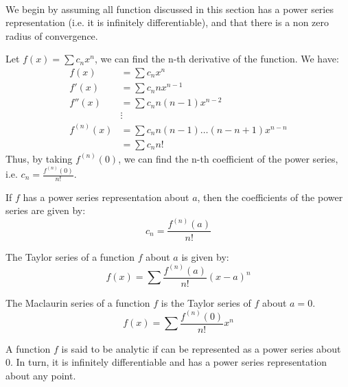 \documentclass[11pt]{article}
\begin{document}
\paragraph{} We begin by assuming all function discussed in this section has a power series representation (i.e. it is infinitely differentiable), and that there is a non zero radius of convergence.
\begin{example}
    Let $f(x) = \sum c_n x^n$, we can find the n-th derivative of the function. We have:
    \begin{align*}
        f(x) &= \sum c_n x^n \\
        f'(x) &= \sum c_n n x^{n-1} \\
        f''(x) &= \sum c_n n(n-1) x^{n-2} \\
        &\vdots \\
        f^{(n)}(x) &= \sum c_n n(n-1) \ldots (n-n+1) x^{n-n} \\
        &= \sum c_n n!
    \end{align*}
    Thus, by taking $f^{(n)}(0)$, we can find the n-th coefficient of the power series, i.e. $c_n = \frac{f^{(n)}(0)}{n!}$.
\end{example}
\begin{theorem}
    If $f$ has a power series representation about $a$, then the coefficients of the power series are given by:
    \begin{equation}
        c_n = \frac{f^{(n)}(a)}{n!}
    \end{equation}
\end{theorem}
\begin{definition}
    The Taylor series of a function $f$ about $a$ is given by:
    \begin{equation}
        f(x) = \sum \frac{f^{(n)}(a)}{n!} (x-a)^n 
    \end{equation}
\end{definition}
\begin{definition}
    The Maclaurin series of a function $f$ is the Taylor series of $f$ about $a=0$.
    \begin{equation}
        f(x) = \sum \frac{f^{(n)}(0)}{n!} x^n
    \end{equation}
\end{definition}
\begin{definition}
    A function $f$ is said to be analytic if can be represented as a power series about 0. In turn, it is infinitely differentiable and has a power series representation about any point.
\end{definition}
\end{document}

